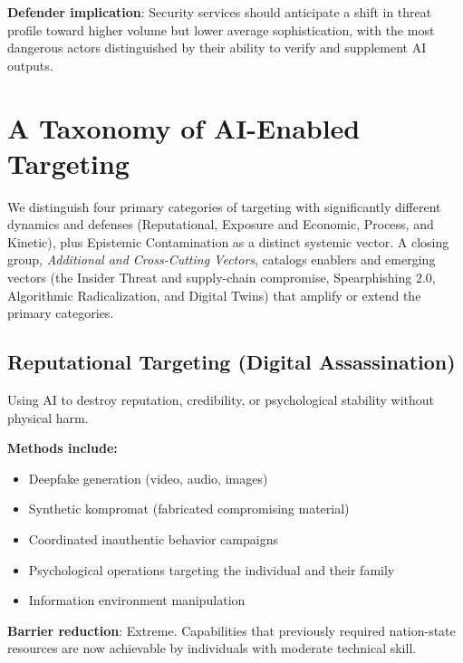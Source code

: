 \documentclass[11pt,letterpaper]{article}
\begin{document}
\textbf{Defender implication}: Security services should anticipate a shift in threat profile toward higher volume but lower average sophistication, with the most dangerous actors distinguished by their ability to verify and supplement AI outputs.

\section{A Taxonomy of AI-Enabled Targeting}

We distinguish four primary categories of targeting with significantly different dynamics and defenses (Reputational, Exposure and Economic, Process, and Kinetic), plus Epistemic Contamination as a distinct systemic vector. A closing group, \textit{Additional and Cross-Cutting Vectors}, catalogs enablers and emerging vectors (the Insider Threat and supply-chain compromise, Spearphishing 2.0, Algorithmic Radicalization, and Digital Twins) that amplify or extend the primary categories.

\subsection{Reputational Targeting (Digital Assassination)}

Using AI to destroy reputation, credibility, or psychological stability without physical harm.

\textbf{Methods include:}
\begin{itemize}
  \item Deepfake generation (video, audio, images)
  \item Synthetic kompromat (fabricated compromising material)
  \item Coordinated inauthentic behavior campaigns
  \item Psychological operations targeting the individual and their family
  \item Information environment manipulation
\end{itemize}

\textbf{Barrier reduction}: Extreme. Capabilities that previously required nation-state resources are now achievable by individuals with moderate technical skill.
\end{document}
